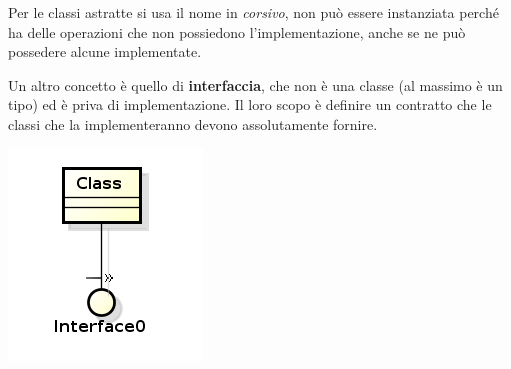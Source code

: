 Per le classi astratte si usa il nome in \textit{corsivo}, non può essere instanziata perché ha delle operazioni che non possiedono l'implementazione, anche se ne può possedere alcune implementate.

Un altro concetto è quello di \textbf{interfaccia}, che non è una classe (al massimo è un tipo) ed è priva di implementazione. Il loro scopo è definire un contratto che le classi che la implementeranno devono assolutamente fornire.

\begin{center}

\includegraphics[width=0.75\columnwidth]{img16} %

\end{center}